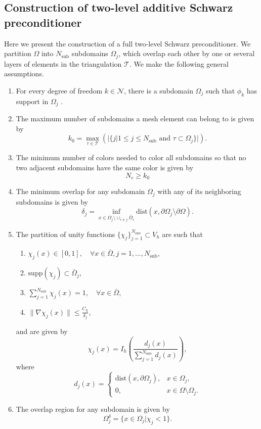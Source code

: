 \subsection{Construction of two-level additive Schwarz preconditioner}\label{sec:two_level_ASM_construction}
Here we present the construction of a full two-level Schwarz preconditioner. We partition $\Omega$ into $N_{\text{sub}}$ subdomains $\Omega_j$, which overlap each other by one or several layers of elements in the triangulation $\mathcal{T}$. We make the following general assumptions.
\begin{enumerate}[label=\textbf{D\arabic*}, ref=\textbf{D\arabic*}]
  \item\label{ASM_observation:basis_inclusion} For every degree of freedom $k\in\mathcal{N}$, there is a subdomain $\Omega_j$ such that $\phi_k$ has support in $\Omega_j$ \cite[Lemma 5.3]{schwarz_methods_Dolean_2015}.
  \item\label{ASM_observation:multiplicity_of_intersections} The maximum number of subdomains a mesh element can belong to is given by
  \[
    k_0 = \max_{\tau\in\mathcal{T}} \left (|\{j|1\leq j\leq N_{\text{sub}} \text{ and } \tau \subset \Omega_j\}| \right).
  \]
  \item\label{ASM_observation:number_of_colors} The minimum number of colors needed to color all subdomains so that no two adjacent subdomains have the same color is given by
  \[
    N_c \geq k_0
  \]
  \item\label{ASM_observation:overlapping_parameter} The minimum overlap for any subdomain $\Omega_j$ with any of its neighboring subdomains is given by
  \[
    \delta_j = \inf_{x\in\Omega_j\setminus\cup_{i\neq j} \bar{\Omega}_i} \text{dist}(x, \partial \Omega_j\setminus\partial \Omega).
  \]
  \item\label{ASM_observation:partition_of_unity} The partition of unity functions $\{\chi_j\}_{j=1}^{N_{\text{sub}}}\subset V_h$ are such that
  \begin{enumerate}[label*=.\alph*]
    \item $\chi_j(x) \in [0,1], \quad \forall x\in\bar{\Omega}, j=1,\ldots,N_{\text{sub}}$,
    \item $\text{supp}(\chi_j) \subset \bar{\Omega}_j$,
    \item $\sum_{j=1}^{N_{\text{sub}}} \chi_j(x) = 1, \quad \forall x\in\bar{\Omega}$,
    \item $\|\nabla\chi_j(x)\| \leq \frac{C_{\chi}}{\delta_j}$,
  \end{enumerate}
  and are given by
  \[
    \chi_j(x) = I_h\left(\frac{d_j(x)}{\sum_{j=1}^{N_{\text{sub}}} d_j(x)}\right),
  \]
  where
  \[
    d_j(x) =
    \begin{cases}
      \text{dist}(x, \partial \Omega_j), & x\in\Omega_j,                \\
      0,                                 & x\in\Omega\setminus\Omega_j.
    \end{cases}
  \]
  \item\label{ASM_observation:overlap_region} The overlap region for any subdomain is given by
  \[
    \Omega_j^{\delta} = \{x\in\Omega_j| \chi_j < 1\}.
  \]
\end{enumerate}

